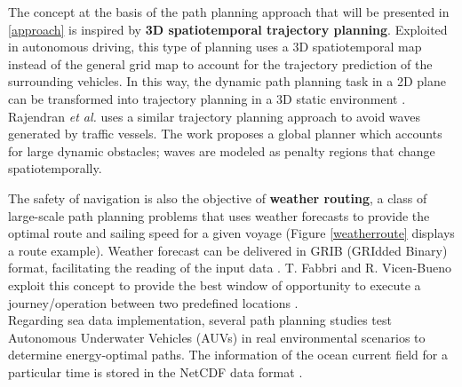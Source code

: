 The concept at the basis of the path planning approach that will be presented in \autoref{approach} is inspired by \textbf{3D spatiotemporal trajectory planning}. Exploited in autonomous driving, this type of planning uses a 3D spatiotemporal map instead of the general grid map to account for the trajectory prediction of the surrounding vehicles.  In this way, the dynamic path planning task in a 2D plane can be transformed into trajectory planning in a 3D static environment \cite{xin2021enable, zhang2021unified, zhang2020trajectory}.\\
Rajendran \textit{et al.} \cite{rajendran2018wave} uses a similar trajectory planning approach to avoid waves generated by traffic vessels. The work proposes a global planner which accounts for large dynamic obstacles; waves are modeled as penalty regions that change spatiotemporally.
\vspace{0.3cm}

The safety of navigation is also the objective of \textbf{weather routing}, a class of large-scale path planning problems that uses weather forecasts to provide the optimal route and sailing speed for a given voyage \cite{zis2020ship} (Figure \ref{weatherroute} displays a route example).
Weather forecast can be delivered in GRIB (GRIdded Binary) format, facilitating the reading of the input data \cite{pennino2020development}. T. Fabbri and R. Vicen-Bueno exploit this concept to provide the best window of opportunity to execute a journey/operation between two predefined locations \cite{fabbri2021decision}. \\
Regarding sea data implementation, several path planning studies test Autonomous Underwater Vehicles (AUVs) in real environmental scenarios to determine energy-optimal paths. The information of the ocean current field for a particular time is stored in the NetCDF data format \cite{rao2009large, eichhorn2015optimal, garau2009path, SONG2017301}.
\vspace{0.3cm}

